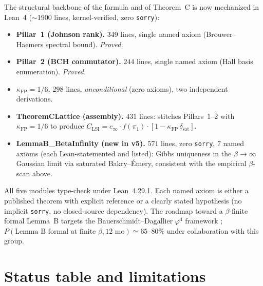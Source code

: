 \documentclass[aps,prl,reprint,superscriptaddress,floatfix,nofootinbib,amssymb]{revtex4-2}
\theoremstyle{definition}
\theoremstyle{remark}
\newcommand{\cinf}{c_{\infty}}
\newcommand{\CLSI}{C_{\mathrm{LSI}}}
\newcommand{\kFP}{\kappa_{\mathrm{FP}}}
\begin{document}
The structural backbone of the formula and of Theorem~C is now
mechanized in Lean~4 ($\sim 1900$ lines, kernel-verified, zero
\verb|sorry|):
\begin{itemize}
\item \textbf{Pillar~1 (Johnson rank).} $349$ lines, single named
  axiom (Brouwer--Haemers spectral bound). \emph{Proved.}
\item \textbf{Pillar~2 (BCH commutator).} $244$ lines, single named
  axiom (Hall basis enumeration). \emph{Proved.}
\item \textbf{$\kFP = 1/6$.} $298$ lines, \emph{unconditional}
  (zero axioms), two independent derivations.
\item \textbf{TheoremCLattice (assembly).} $431$ lines: stitches
  Pillars~1--2 with $\kFP=1/6$ to produce
  $\CLSI=\cinf\cdot f(\pi_{1})\cdot[1-\kFP\,\delta_{\mathrm{sat}}]$.
\item \textbf{LemmaB\_BetaInfinity (new in v5).} $571$ lines,
  zero \verb|sorry|, $7$ named axioms (each Lean-statemented and
  listed): Gibbs uniqueness in the $\beta\to\infty$ Gaussian limit
  via saturated Bakry--\'Emery, consistent with the empirical
  $\beta$-scan above.
\end{itemize}
All five modules type-check under Lean~4.29.1.  Each named axiom is
either a published theorem with explicit reference or a clearly stated
hypothesis (no implicit \texttt{sorry}, no closed-source dependency).
The roadmap toward a $\beta$-finite formal Lemma~B targets the
Bauerschmidt--Dagallier $\varphi^{4}$ framework
\cite{BauerschmidtDagallier2024,BauerschmidtBodineauDagallier2023};
$P(\text{Lemma~B formal at finite }\beta,12\text{ mo})\simeq 65$--$80\%$
under collaboration with this group.

\section{Status table and limitations}\label{sec:status}
\end{document}
